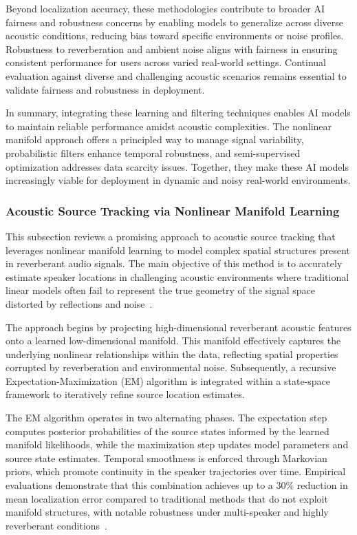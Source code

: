 \documentclass[sigconf]{acmart}
\begin{document}
Beyond localization accuracy, these methodologies contribute to broader AI fairness and robustness concerns by enabling models to generalize across diverse acoustic conditions, reducing bias toward specific environments or noise profiles. Robustness to reverberation and ambient noise aligns with fairness in ensuring consistent performance for users across varied real-world settings. Continual evaluation against diverse and challenging acoustic scenarios remains essential to validate fairness and robustness in deployment.

In summary, integrating these learning and filtering techniques enables AI models to maintain reliable performance amidst acoustic complexities. The nonlinear manifold approach offers a principled way to manage signal variability, probabilistic filters enhance temporal robustness, and semi-supervised optimization addresses data scarcity issues. Together, they make these AI models increasingly viable for deployment in dynamic and noisy real-world environments.

\subsubsection{Acoustic Source Tracking via Nonlinear Manifold Learning}

This subsection reviews a promising approach to acoustic source tracking that leverages nonlinear manifold learning to model complex spatial structures present in reverberant audio signals. The main objective of this method is to accurately estimate speaker locations in challenging acoustic environments where traditional linear models often fail to represent the true geometry of the signal space distorted by reflections and noise~\cite{ref38}.

The approach begins by projecting high-dimensional reverberant acoustic features onto a learned low-dimensional manifold. This manifold effectively captures the underlying nonlinear relationships within the data, reflecting spatial properties corrupted by reverberation and environmental noise. Subsequently, a recursive Expectation-Maximization (EM) algorithm is integrated within a state-space framework to iteratively refine source location estimates.

The EM algorithm operates in two alternating phases. The expectation step computes posterior probabilities of the source states informed by the learned manifold likelihoods, while the maximization step updates model parameters and source state estimates. Temporal smoothness is enforced through Markovian priors, which promote continuity in the speaker trajectories over time. Empirical evaluations demonstrate that this combination achieves up to a 30\% reduction in mean localization error compared to traditional methods that do not exploit manifold structures, with notable robustness under multi-speaker and highly reverberant conditions~\cite{ref38}.
\end{document}
